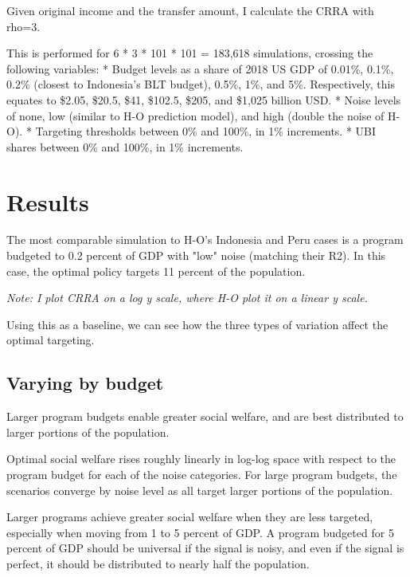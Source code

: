 \documentclass[12pt]{article}
\begin{document}
Given original income and the transfer amount, I calculate the CRRA with rho=3.

This is performed for 6 * 3 * 101 * 101 = 183,618 simulations, crossing the 
following variables:
* Budget levels as a share of 2018 US GDP of 0.01\%, 0.1\%, 0.2\% (closest to 
Indonesia's BLT budget), 0.5\%, 1\%, and 5\%. Respectively, this equates to 
\$2.05, \$20.5, \$41, \$102.5, \$205, and \$1,025 billion USD.
* Noise levels of none, low (similar to H-O prediction model), and high (double 
the noise of H-O).
* Targeting thresholds between 0\% and 100\%, in 1\% increments.
* UBI shares between 0\% and 100\%, in 1\% increments.


\section{Results} \label{sec:results}

The most comparable simulation to H-O's Indonesia and Peru cases is a program 
budgeted to 0.2 percent of GDP with "low" noise (matching their R2). In this 
case, the optimal policy targets 11 percent of the population. 

\begin{center}
\label{fig:pov_rate_income}
\end{center}

\it{Note: I plot CRRA on a log y scale, where H-O plot it on a linear y scale.}

Using this as a baseline, we can see how the three types of variation affect 
the optimal targeting.

\subsection{Varying by budget} \label{varying_by_budget}

Larger program budgets enable greater social welfare, and are best distributed 
to larger portions of the population.


Optimal social welfare rises roughly linearly in log-log space with respect to 
the program budget for each of the noise categories. For large program budgets, 
the scenarios converge by noise level as all target larger portions of the 
population.


Larger programs achieve greater social welfare when they are less targeted, 
especially when moving from 1 to 5 percent of GDP. A program budgeted for 5 
percent of GDP should be universal if the signal is noisy, and even if the 
signal is perfect, it should be distributed to nearly half the population.
\end{document}
